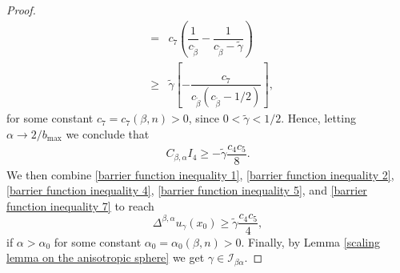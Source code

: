\documentclass[10pt, leqno]{article}
\theoremstyle{definition}
\theoremstyle{remark}
\numberwithin{equation}{section}
\begin{document}
\begin{proof}
\begin{eqnarray}
& = & c_{7}\left( \dfrac{1}{c_{\tilde{\beta}}} - \dfrac{1}{c_{\tilde{\beta}} - \tilde{\gamma}}\right)\\
& \geq &  \tilde{\gamma}\left[ - \dfrac{c_{7}}{c_{\tilde{\beta}}(c_{\tilde{\beta}}-1/2)} \right],
\end{eqnarray}
for some constant $c_{7}=c_{7}\left( \beta, n \right) >0$, since $0 < \tilde{\gamma} < 1/2$. Hence, letting $\alpha \rightarrow 2/b_{\max}$ we conclude that
\begin{eqnarray}
\label{barrier function inequality 7}
C_{\beta, \alpha} I_{4} \geq - \tilde{\gamma}\dfrac{c_{4}c_{5}}{8}.
\end{eqnarray}
We then combine \eqref{barrier function inequality 1}, \eqref{barrier function inequality 2}, \eqref{barrier function inequality 4}, \eqref{barrier function inequality 5}, and \eqref{barrier function inequality 7} to reach
$$
\Delta^{\beta, \alpha} u_{\gamma}\left( x_{0} \right) \geq \tilde{\gamma} \dfrac{c_{4}c_{5}}{4},
$$
if $\alpha > \alpha_{0}$ for some constant $\alpha_{0}= \alpha_{0}\left( \beta, n \right) > 0$. Finally, by Lemma \ref{scaling lemma on the anisotropic sphere} we get $\gamma \in \mathcal{I}_{\beta \alpha}$.
\end{proof}
\end{document}
